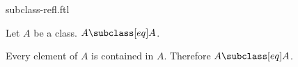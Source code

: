 \documentclass{article}
\begin{document}
\begin{smodule}[creators={Marcel Schütz}]{subclass-refl.ftl}

  \begin{fproposition*}[label=5994555614691328]
    Let $A$ be a class.
    $A \subclass[eq] A$.
  \end{fproposition*}
  \begin{fproof}
    Every element of $A$ is contained in $A$.
    Therefore $A \subclass[eq] A$.
  \end{fproof}
\end{smodule}
\end{document}
